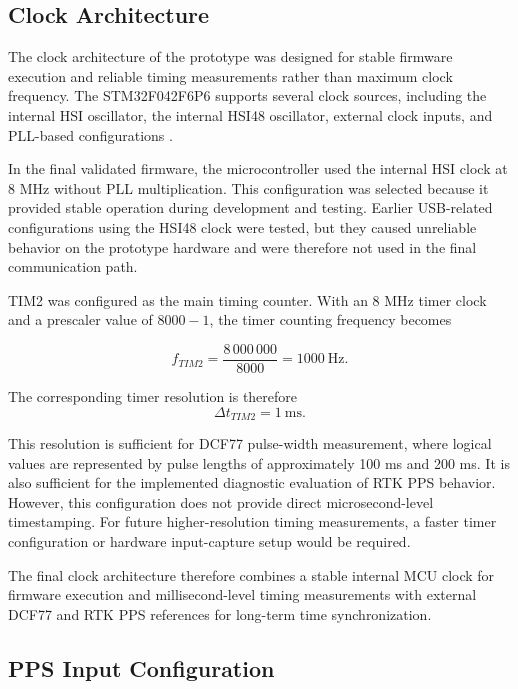 \subsection{Clock Architecture}

The clock architecture of the prototype was designed for stable firmware execution and reliable timing measurements rather than maximum clock frequency. The STM32F042F6P6 supports several clock sources, including the internal HSI oscillator, the internal HSI48 oscillator, external clock inputs, and PLL-based configurations \cite{stm32F042Datasheet,stm32F0ReferenceManual}.

In the final validated firmware, the microcontroller used the internal HSI clock at 8 MHz without PLL multiplication. This configuration was selected because it provided stable operation during development and testing. Earlier USB-related configurations using the HSI48 clock were tested, but they caused unreliable behavior on the prototype hardware and were therefore not used in the final communication path.

TIM2 was configured as the main timing counter. With an 8 MHz timer clock and a prescaler value of $8000 - 1$, the timer counting frequency becomes

\begin{equation}
f_{TIM2} = \frac{8\,000\,000}{8000} = 1000~\mathrm{Hz}.
\end{equation}

The corresponding timer resolution is therefore
\begin{equation}
\Delta t_{TIM2} = 1~\mathrm{ms}.
\end{equation}

This resolution is sufficient for DCF77 pulse-width measurement, where logical values are represented by pulse lengths of approximately 100 ms and 200 ms. It is also sufficient for the implemented diagnostic evaluation of RTK PPS behavior. However, this configuration does not provide direct microsecond-level timestamping. For future higher-resolution timing measurements, a faster timer configuration or hardware input-capture setup would be required.

The final clock architecture therefore combines a stable internal MCU clock for firmware execution and millisecond-level timing measurements with external DCF77 and RTK PPS references for long-term time synchronization.

\subsection{PPS Input Configuration}

